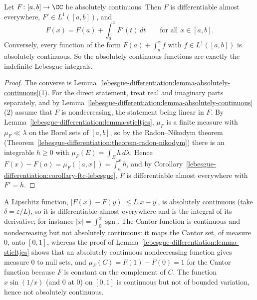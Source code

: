 \begin{theorem}\label{lebesgue-differentiation:theorem-absolutely-continuous}
Let $F \colon [a, b] \to \CC$ be absolutely continuous. Then $F$ is differentiable almost everywhere, $F' \in L^1([a, b])$, and
\[
F(x) = F(a) + \int_a^xF'(t)\,dt \qquad \text{for all } x \in [a, b].
\]
Conversely, every function of the form $F(a) + \int_a^xf$ with $f \in L^1([a, b])$ is absolutely continuous. So the absolutely continuous functions are exactly the indefinite
Lebesgue integrals.
\end{theorem}

\begin{proof}
The converse is Lemma~\ref{lebesgue-differentiation:lemma-absolutely-continuous}(1). For the direct statement, treat real and imaginary parts separately, and by
Lemma~\ref{lebesgue-differentiation:lemma-absolutely-continuous}(2) assume that $F$ is nondecreasing, the statement being linear in $F$. By
Lemma~\ref{lebesgue-differentiation:lemma-stieltjes}, $\mu_F$ is a finite measure with $\mu_F \ll \lambda$ on the Borel sets of $[a, b]$, so by the Radon--Nikodym theorem
(Theorem~\ref{lebesgue-differentiation:theorem-radon-nikodym}) there is an integrable $h \geq 0$ with $\mu_F(E) = \int_Eh\,d\lambda$. Hence $F(x) - F(a) = \mu_F([a, x]) = \int_a^xh$, and by
Corollary~\ref{lebesgue-differentiation:corollary-ftc-lebesgue}, $F$ is differentiable almost everywhere with $F' = h$.
\end{proof}

\begin{example}\label{lebesgue-differentiation:example-absolutely-continuous}
A Lipschitz function, $|F(x) - F(y)| \leq L|x - y|$, is absolutely continuous (take $\delta = \varepsilon/L$), so it is differentiable almost everywhere and is the integral of its
derivative; for instance $|x| = \int_0^x\operatorname{sgn}$. The Cantor function is continuous and nondecreasing but not absolutely continuous: it maps the Cantor set, of measure
$0$, onto $[0, 1]$, whereas the proof of Lemma~\ref{lebesgue-differentiation:lemma-stieltjes} shows that an absolutely continuous nondecreasing function gives measure $0$ to null sets, and
$\mu_F(C) = F(1) - F(0) = 1$ for the Cantor function because $F$ is constant on the complement of $C$. The function $x\sin(1/x)$ (and $0$ at $0$) on $[0, 1]$ is continuous but not
of bounded variation, hence not absolutely continuous.
\end{example}

